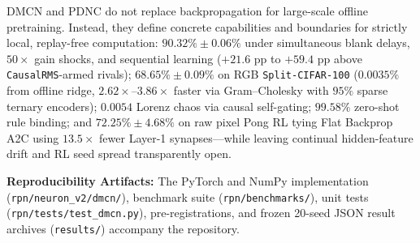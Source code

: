 \documentclass[11pt,a4paper]{article}
\begin{document}
DMCN and PDNC do not replace backpropagation for large-scale offline pretraining. Instead, they define concrete capabilities and boundaries for strictly local, replay-free computation: $90.32\% \pm 0.06\%$ under simultaneous blank delays, $50\times$ gain shocks, and sequential learning ($+21.6\text{ pp}$ to $+59.4\text{ pp}$ above \texttt{CausalRMS}-armed rivals); $68.65\% \pm 0.09\%$ on RGB \texttt{Split-CIFAR-100} ($0.0035\%$ from offline ridge, $2.62\times\text{--}3.86\times$ faster via Gram--Cholesky with $95\%$ sparse ternary encoders); $0.0054$ Lorenz chaos via causal self-gating; $99.58\%$ zero-shot rule binding; and $72.25\% \pm 4.68\%$ on raw pixel Pong RL tying Flat Backprop A2C using $13.5\times$ fewer Layer-1 synapses---while leaving continual hidden-feature drift and RL seed spread transparently open.

\textbf{Reproducibility Artifacts:} The PyTorch and NumPy implementation (\texttt{rpn/neuron\_v2/dmcn/}), benchmark suite (\texttt{rpn/benchmarks/}), unit tests (\texttt{rpn/tests/test\_dmcn.py}), pre-registrations, and frozen 20-seed JSON result archives (\texttt{results/}) accompany the repository.

\appendix
\end{document}
